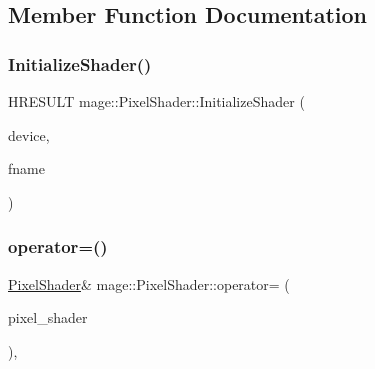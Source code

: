 \subsection{Member Function Documentation}
\hypertarget{classmage_1_1_pixel_shader_ae7b66bd5193c91a02c679acf06367f44}{}\label{classmage_1_1_pixel_shader_ae7b66bd5193c91a02c679acf06367f44} 
\subsubsection{\texorpdfstring{Initialize\+Shader()}{InitializeShader()}}
{\footnotesize\ttfamily H\+R\+E\+S\+U\+LT mage\+::\+Pixel\+Shader\+::\+Initialize\+Shader (\begin{DoxyParamCaption}\item[{I\+D3\+D11\+Device2 $\ast$}]{device,  }\item[{const wstring \&}]{fname }\end{DoxyParamCaption})\hspace{0.3cm}{\ttfamily [protected]}}

\hypertarget{classmage_1_1_pixel_shader_ac3a3535b2751237f4aad110dca05d0c3}{}\label{classmage_1_1_pixel_shader_ac3a3535b2751237f4aad110dca05d0c3} 
\subsubsection{\texorpdfstring{operator=()}{operator=()}}
{\footnotesize\ttfamily \hyperlink{classmage_1_1_pixel_shader}{Pixel\+Shader}\& mage\+::\+Pixel\+Shader\+::operator= (\begin{DoxyParamCaption}\item[{const \hyperlink{classmage_1_1_pixel_shader}{Pixel\+Shader} \&}]{pixel\+\_\+shader }\end{DoxyParamCaption})\hspace{0.3cm}{\ttfamily [private]}, {\ttfamily [delete]}}

\hypertarget{classmage_1_1_pixel_shader_a5d839de7aac9a6655c2a2296aafbe231}{}\label{classmage_1_1_pixel_shader_a5d839de7aac9a6655c2a2296aafbe231} 
